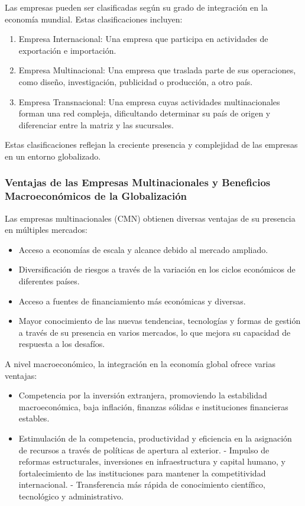 \documentclass[
  a4paper,
]{article}
\providecommand{\tightlist}{%
  \setlength{\itemsep}{0pt}\setlength{\parskip}{0pt}}\usepackage{longtable,booktabs,array}
\begin{document}
Las empresas pueden ser clasificadas según su grado de integración en la
economía mundial. Estas clasificaciones incluyen:

\begin{enumerate}
\def\labelenumi{\arabic{enumi}.}
\tightlist
\item
  Empresa Internacional: Una empresa que participa en actividades de
  exportación e importación.
\item
  Empresa Multinacional: Una empresa que traslada parte de sus
  operaciones, como diseño, investigación, publicidad o producción, a
  otro país.
\item
  Empresa Transnacional: Una empresa cuyas actividades multinacionales
  forman una red compleja, dificultando determinar su país de origen y
  diferenciar entre la matriz y las sucursales.
\end{enumerate}

Estas clasificaciones reflejan la creciente presencia y complejidad de
las empresas en un entorno globalizado.

\subsubsection{Ventajas de las Empresas Multinacionales y Beneficios
Macroeconómicos de la
Globalización}\label{ventajas-de-las-empresas-multinacionales-y-beneficios-macroeconuxf3micos-de-la-globalizaciuxf3n}

Las empresas multinacionales (CMN) obtienen diversas ventajas de su
presencia en múltiples mercados:

\begin{itemize}
\tightlist
\item
  Acceso a economías de escala y alcance debido al mercado ampliado.
\item
  Diversificación de riesgos a través de la variación en los ciclos
  económicos de diferentes países.
\item
  Acceso a fuentes de financiamiento más económicas y diversas.
\item
  Mayor conocimiento de las nuevas tendencias, tecnologías y formas de
  gestión a través de su presencia en varios mercados, lo que mejora su
  capacidad de respuesta a los desafíos.
\end{itemize}

A nivel macroeconómico, la integración en la economía global ofrece
varias ventajas:

\begin{itemize}
\tightlist
\item
  Competencia por la inversión extranjera, promoviendo la estabilidad
  macroeconómica, baja inflación, finanzas sólidas e instituciones
  financieras estables.
\item
  Estimulación de la competencia, productividad y eficiencia en la
  asignación de recursos a través de políticas de apertura al exterior.
  - Impulso de reformas estructurales, inversiones en infraestructura y
  capital humano, y fortalecimiento de las instituciones para mantener
  la competitividad internacional. - Transferencia más rápida de
  conocimiento científico, tecnológico y administrativo.
\end{itemize}
\end{document}
